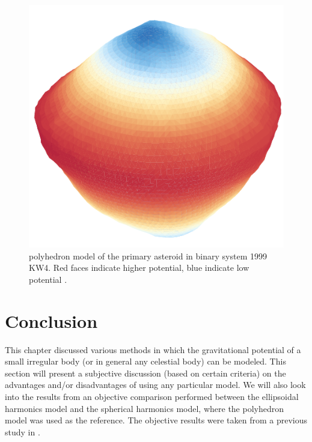 \begin{figure}[h]
\centering
\captionsetup{justification=centering}
\includegraphics[scale=0.5]{kw4.png}
\caption{polyhedron model of the primary asteroid in binary system 1999 KW4. Red faces indicate higher potential, blue indicate low potential \cite{stefaan_thesis}.}
\label{fig:poly_examp}
\end{figure}
\FloatBarrier
%
\section{Conclusion}
This chapter discussed various methods in which the gravitational potential of a small irregular body (or in general any celestial body) can be modeled. This section will present a subjective discussion (based on certain criteria) on the advantages and/or disadvantages of using any particular model. We will also look into the results from an objective comparison performed between the ellipsoidal harmonics model and the spherical harmonics model, where the polyhedron model was used as the reference. The objective results were taken from a previous study in \cite{spherical_ellipsoidal_comparison}.

